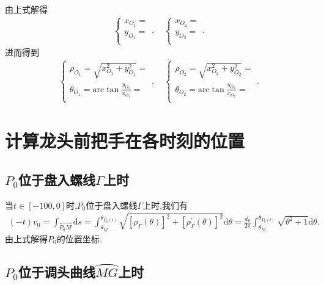 \documentclass[lang=cn,newtx,10pt,scheme=chinese]{../Template/elegantbook}
\begin{document}
由上式解得
\begin{align}
\begin{cases}
x_{O_1}=\\
y_{O_1}=\\
\end{cases},\quad \begin{cases}
x_{O_2}=\\
y_{O_2}=\\
\end{cases}.
\end{align}
进而得到
\begin{align}
\begin{cases}
\rho _{O_1}=\sqrt{x_{O_1}^{2}+y_{O_1}^{2}}=\\
\theta _{O_1}=\mathrm{arc}\tan \frac{y_{O_1}}{x_{O_1}}=\\
\end{cases},\quad \begin{cases}
\rho _{O_2}=\sqrt{x_{O_2}^{2}+y_{O_2}^{2}}=\\
\theta _{O_2}=\mathrm{arc}\tan \frac{y_{O_2}}{x_{O_2}}=\\
\end{cases}.
\end{align}

\section{计算龙头前把手在各时刻的位置}

\subsection{$P_0$位于盘入螺线$\varGamma$上时}

当$t\in[-100,0]$时,$P_0$位于盘入螺线$\varGamma$上时,我们有
\begin{align}
\left( -t \right) v_0=\int_{\wideparen{P_0M}}{\mathrm{d}s}=\int_{\theta _M}^{\theta _{P_0\left( t \right)}}{\sqrt{\left[ \rho _{\varGamma}\left( \theta \right) \right] ^2+\left[ \rho _{\varGamma}^{\prime}\left( \theta \right) \right] ^2}\mathrm{d}\theta}=\frac{d_0}{2\pi}\int_{\theta _M}^{\theta _{P_0\left( t \right)}}{\sqrt{{\theta}^2+1}\mathrm{d}\theta}.
\end{align}
由上式解得$P_0$的位置坐标.

\subsection{$P_0$位于调头曲线$\wideparen{MG}$上时}
\end{document}
